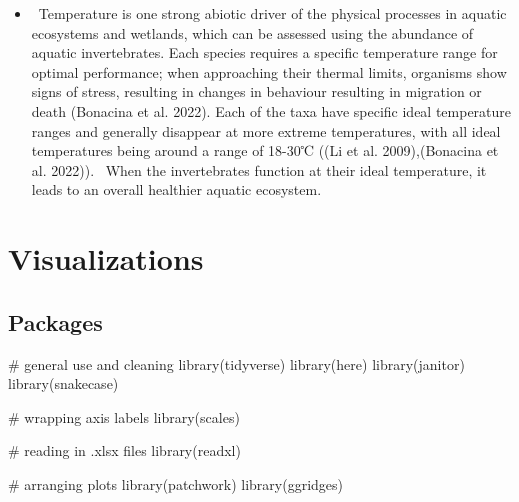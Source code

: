 \documentclass[
  letterpaper,
  DIV=11,
  numbers=noendperiod]{scrartcl}
\newenvironment{Shaded}{\begin{snugshade}}{\end{snugshade}}
\newcommand{\CommentTok}[1]{\textcolor[rgb]{0.37,0.37,0.37}{#1}}
\newcommand{\FunctionTok}[1]{\textcolor[rgb]{0.28,0.35,0.67}{#1}}
\newcommand{\NormalTok}[1]{\textcolor[rgb]{0.00,0.23,0.31}{#1}}
\begin{document}
\begin{itemize}
  invertebrates are not just indicators at NCOS, but all wetlands.
  According to Ecological Indicators, due to their short life spans and
  vulnerability to ecological stressors, aquatic invertebrates are
  widely used to measure the health of wetlands and aquatic ecosystems.
  Each are meaningful in their own ways as processors of organic
  material and prey for larger species (Dehingia et al. 2026). They all
  sit at the bottom of the food chain and bridge the gap between primary
  producers and larger predators like fish and waterbirds by being an
  easy food source for larger predators (Kwok et al. 2015). Copepods are
  especially important in transferring energy to higher trophic levels,
  cladocera are primarily filter feeders, and ostracods serve as strong
  bioindicators of environmental conditions (Dehingia et al. 2026).
\item
  ~Temperature is one strong abiotic driver of the physical processes in
  aquatic ecosystems and wetlands, which can be assessed using the
  abundance of aquatic invertebrates. Each species requires a specific
  temperature range for optimal performance; when approaching their
  thermal limits, organisms show signs of stress, resulting in changes
  in behaviour resulting in migration or death (Bonacina et al. 2022).
  Each of the taxa have specific ideal temperature ranges and generally
  disappear at more extreme temperatures, with all ideal temperatures
  being around a range of 18-30℃ ((Li et al. 2009),(Bonacina et al.
  2022)).~ When the invertebrates function at their ideal temperature,
  it leads to an overall healthier aquatic ecosystem.
\end{itemize}

\section{Visualizations}\label{visualizations}

\subsection{Packages}\label{packages}

\begin{Shaded}
\begin{Highlighting}[]
\CommentTok{\# general use and cleaning}
\FunctionTok{library}\NormalTok{(tidyverse)}
\FunctionTok{library}\NormalTok{(here)}
\FunctionTok{library}\NormalTok{(janitor)}
\FunctionTok{library}\NormalTok{(snakecase)}

\CommentTok{\# wrapping axis labels}
\FunctionTok{library}\NormalTok{(scales)}

\CommentTok{\# reading in .xlsx files}
\FunctionTok{library}\NormalTok{(readxl)}

\CommentTok{\# arranging plots}
\FunctionTok{library}\NormalTok{(patchwork)}
\FunctionTok{library}\NormalTok{(ggridges)}
\end{Highlighting}
\end{Shaded}
\end{document}
